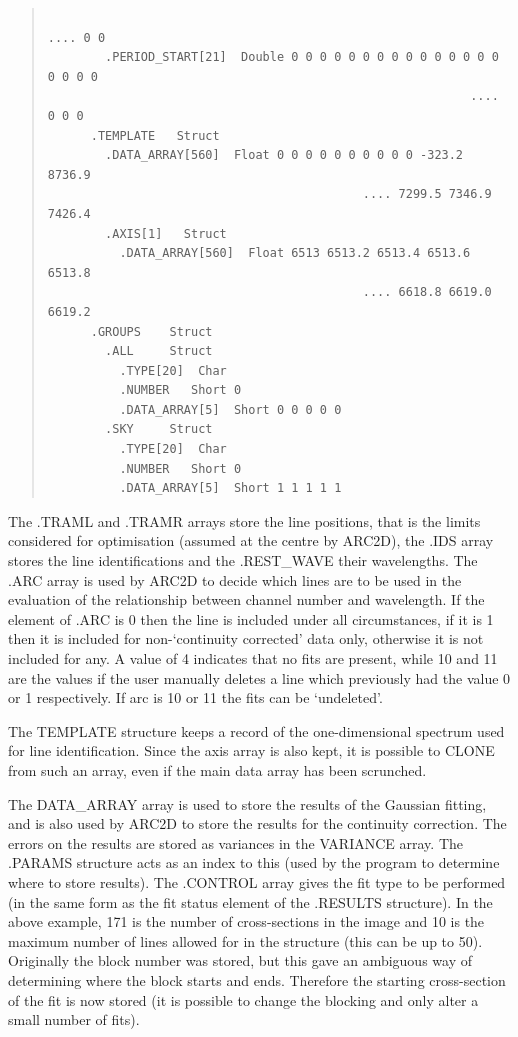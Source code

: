 \begin{quote}
\begin{verbatim}
                                                             .... 0 0
        .PERIOD_START[21]  Double 0 0 0 0 0 0 0 0 0 0 0 0 0 0 0 0 0 0 0
                                                           .... 0 0 0
      .TEMPLATE   Struct
        .DATA_ARRAY[560]  Float 0 0 0 0 0 0 0 0 0 0 -323.2 8736.9
                                            .... 7299.5 7346.9 7426.4
        .AXIS[1]   Struct
          .DATA_ARRAY[560]  Float 6513 6513.2 6513.4 6513.6 6513.8
                                            .... 6618.8 6619.0 6619.2
      .GROUPS    Struct
        .ALL     Struct
          .TYPE[20]  Char
          .NUMBER   Short 0
          .DATA_ARRAY[5]  Short 0 0 0 0 0
        .SKY     Struct
          .TYPE[20]  Char
          .NUMBER   Short 0
          .DATA_ARRAY[5]  Short 1 1 1 1 1
 \end{verbatim}\end{quote}

The .TRAML and .TRAMR arrays store the line positions, that is the limits
considered for optimisation (assumed at the centre by ARC2D), the .IDS
array stores the line identifications and the .REST\_WAVE their wavelengths.
The .ARC array is used by ARC2D to decide which lines are to be used in the
evaluation of the relationship between channel number and wavelength.  If
the element of .ARC is 0 then the line is included under all circumstances,
if it is 1 then it is included for non-`continuity corrected' data only,
otherwise it is not included for any.  A value of 4 indicates that no fits
are present, while 10 and 11 are the values if the user manually deletes a
line which previously had the value 0 or 1 respectively.  If arc is 10 or
11 the fits can be `undeleted'.

The TEMPLATE structure keeps a record of the one-dimensional spectrum
used for line identification.
Since the axis array is also kept, it is possible to CLONE from such an
array, even if the main data array has been scrunched.

The DATA\_ARRAY array is used to store the results of the Gaussian fitting,
and is also used by ARC2D to store the results for the continuity
correction. The errors on the results are stored as variances in the
VARIANCE array. The .PARAMS structure acts as an index to this (used by
the program to determine where to store results).
The .CONTROL array gives the fit type to be performed (in the same form
as the fit status element of the .RESULTS structure).
In the
above example, 171 is the number of cross-sections in the image and 10
is the maximum number of lines allowed for in the structure (this can
be up to 50). Originally the block number was stored, but this gave an
ambiguous way of determining where the block starts and ends. Therefore
the starting cross-section of the fit is now stored (it is possible to
change the blocking and only alter a small number of fits).

